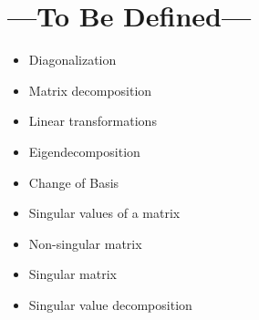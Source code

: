 
\chapter{---To Be Defined---}\label{tbd}
\begin{itemize}
  \item Diagonalization
  \item Matrix decomposition
  \item Linear transformations
  \item Eigendecomposition
  \item Change of Basis
  \item Singular values of a matrix
  \item Non-singular matrix
  \item Singular matrix
  \item Singular value decomposition
\end{itemize}